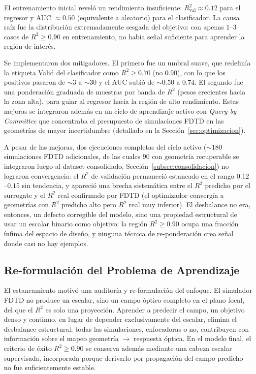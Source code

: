 El entrenamiento inicial reveló un rendimiento insuficiente: $R^2_{\text{val}} \approx 0.12$ para el regresor y AUC $\approx 0.50$ (equivalente a aleatorio) para el clasificador. La causa raíz fue la distribución extremadamente sesgada del objetivo: con apenas $1$--$3$ casos de $R^2 \geq 0.90$ en entrenamiento, no había señal suficiente para aprender la región de interés.

Se implementaron dos mitigadores. El primero fue un umbral suave, que redefinía la etiqueta Valid del clasificador como $R^2 \geq 0.70$ (no $0.90$), con lo que los positivos pasaron de ${\sim}3$ a ${\sim}30$ y el AUC subió de ${\sim}0.50$ a $0.74$. El segundo fue una ponderación graduada de muestras por banda de $R^2$ (pesos crecientes hacia la zona alta), para guiar al regresor hacia la región de alto rendimiento. Estas mejoras se integraron además en un ciclo de aprendizaje activo con \textit{Query by Committee} que concentraba el presupuesto de simulaciones FDTD en las geometrías de mayor incertidumbre (detallado en la Sección~\ref{sec:optimizacion}).

A pesar de las mejoras, dos ejecuciones completas del ciclo activo (${\sim}180$ simulaciones FDTD adicionales, de las cuales $90$ con geometría recuperable se integraron luego al dataset consolidado, Sección~\ref{subsec:consolidacion}) no lograron convergencia: el $R^2$ de validación permaneció estancado en el rango $0.12$--$0.15$ sin tendencia, y apareció una brecha sistemática entre el $R^2$ predicho por el surrogate y el $R^2$ real confirmado por FDTD (el optimizador convergía a geometrías con $R^2$ predicho alto pero $R^2$ real muy inferior). El desbalance no era, entonces, un defecto corregible del modelo, sino una propiedad estructural de usar un escalar binario como objetivo: la región $R^2 \geq 0.90$ ocupa una fracción ínfima del espacio de diseño, y ninguna técnica de re-ponderación crea señal donde casi no hay
ejemplos.

\subsection{Re-formulación del Problema de Aprendizaje}\label{subsec:reformulacion}

El estancamiento motivó una auditoría y re-formulación del enfoque. El simulador FDTD no produce un escalar, sino un campo óptico completo en el plano focal, del que el $R^2$ es solo una proyección. Aprender a predecir el campo, un objetivo denso y continuo, en lugar de depender exclusivamente del escalar, elimina el desbalance estructural: todas las simulaciones, enfocadoras o no, contribuyen con información sobre el mapeo geometría $\rightarrow$ respuesta óptica. En el modelo final, el criterio de éxito $R^2 \geq 0.90$ se conserva además mediante una cabeza escalar supervisada, incorporada porque derivarlo por propagación del campo predicho no fue suficientemente estable.

